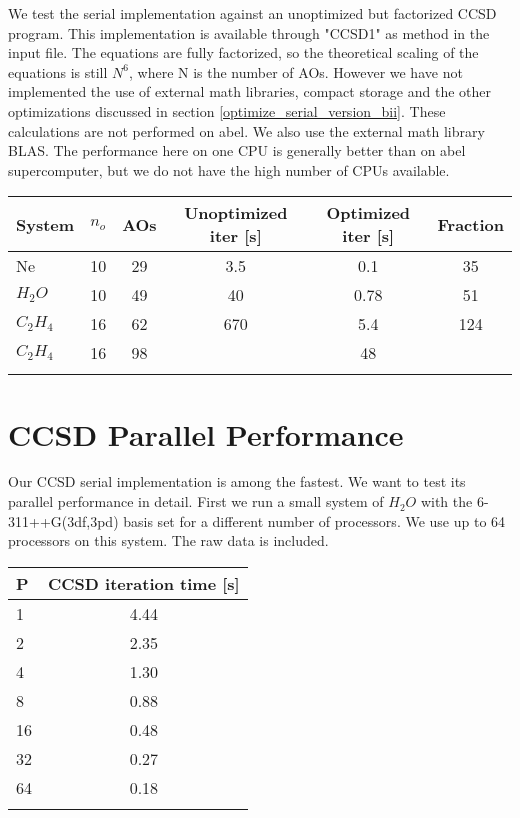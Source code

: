 We test the serial implementation against an unoptimized but factorized CCSD program. This implementation is available through "CCSD1" as method in the input file. The equations are fully factorized, so the theoretical scaling of the equations is still $N^6$, where N is the number of AOs. However we have not implemented the use of external math libraries, compact storage and the other optimizations discussed in section \ref{optimize_serial_version_bii}. These calculations are not performed on abel. We also use the external math library BLAS. The performance here on one CPU is generally better than on abel supercomputer, but we do not have the high number of CPUs available. 

\begin{center}
\begin{tabular}{ l c c c c c }
	\hline
  	System & $n_o$ & AOs & Unoptimized iter [s] & Optimized iter [s] & Fraction \\ \hline
  	Ne & 10 & 29 & 3.5 & 0.1 & 35 \\
  	$H_2O$ & 10 & 49 & 40 & 0.78 & 51 \\
  	$C_2H_4$ & 16 & 62 & 670 & 5.4 & 124 \\
  	$C_2H_4$ & 16 & 98 &  & 48 &  \\
  	\hline
  	\\
	\end{tabular}
\end{center}

\section{CCSD Parallel Performance}
Our CCSD serial implementation is among the fastest. We want to test its parallel performance in detail. First we run a small system of $H_2O$ with the 6-311++G(3df,3pd) basis set for a different number of processors. We use up to 64 processors on this system. The raw data is included.
   
\begin{center}
\begin{tabular}{ l c}
	\hline
  	P & CCSD iteration time [s] \\ \hline
  	1 & 4.44  \\ 
  	2 & 2.35   \\ 
  	4 & 1.30   \\
  	8 & 0.88    \\ 
  	16 & 0.48   \\ 
  	32 & 0.27   \\ 
  	64 & 0.18   \\ \hline
  	\\
	\end{tabular}
\end{center}

